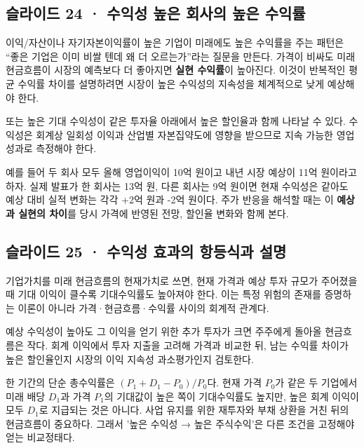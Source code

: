 \documentclass[11pt,a4paper]{article}
\begin{document}
\subsection{슬라이드 24 · 수익성 높은 회사의 높은 수익률}
이익/자산이나 자기자본이익률이 높은 기업이 미래에도 높은 수익률을 주는 패턴은 “좋은 기업은 이미 비쌀 텐데 왜 더 오르는가”라는 질문을 만든다. 가격이 비싸도 미래 현금흐름이 시장의 예측보다 더 좋아지면 \textbf{실현 수익률}이 높아진다. 이것이 반복적인 평균 수익률 차이를 설명하려면 시장이 높은 수익성의 지속성을 체계적으로 낮게 예상해야 한다.\par

또는 높은 기대 수익성이 같은 투자율 아래에서 높은 할인율과 함께 나타날 수 있다. 수익성은 회계상 일회성 이익과 산업별 자본집약도에 영향을 받으므로 지속 가능한 영업 성과로 측정해야 한다.\par

예를 들어 두 회사 모두 올해 영업이익이 10억 원이고 내년 시장 예상이 11억 원이라고 하자. 실제 발표가 한 회사는 13억 원, 다른 회사는 9억 원이면 현재 수익성은 같아도 예상 대비 실적 변화는 각각 +2억 원과 -2억 원이다. 주가 반응을 해석할 때는 이 \textbf{예상과 실현의 차이}를 당시 가격에 반영된 전망, 할인율 변화와 함께 본다.\par

\subsection{슬라이드 25 · 수익성 효과의 항등식과 설명}
기업가치를 미래 현금흐름의 현재가치로 쓰면, 현재 가격과 예상 투자 규모가 주어졌을 때 기대 이익이 클수록 기대수익률도 높아져야 한다. 이는 특정 위험의 존재를 증명하는 이론이 아니라 가격·현금흐름·수익률 사이의 회계적 관계다.\par

예상 수익성이 높아도 그 이익을 얻기 위한 추가 투자가 크면 주주에게 돌아올 현금흐름은 작다. 회계 이익에서 투자 지출을 고려해 가격과 비교한 뒤, 남는 수익률 차이가 높은 할인율인지 시장의 이익 지속성 과소평가인지 검토한다.\par

한 기간의 단순 총수익률은 $(P_1+D_1-P_0)/P_0$다. 현재 가격 $P_0$가 같은 두 기업에서 미래 배당 $D_1$과 가격 $P_1$의 기대값이 높은 쪽이 기대수익률도 높지만, 높은 회계 이익이 모두 $D_1$로 지급되는 것은 아니다. 사업 유지를 위한 재투자와 부채 상환을 거친 뒤의 현금흐름이 중요하다. 그래서 '높은 수익성 → 높은 주식수익'은 다른 조건을 고정해야 얻는 비교정태다.\par
\end{document}
